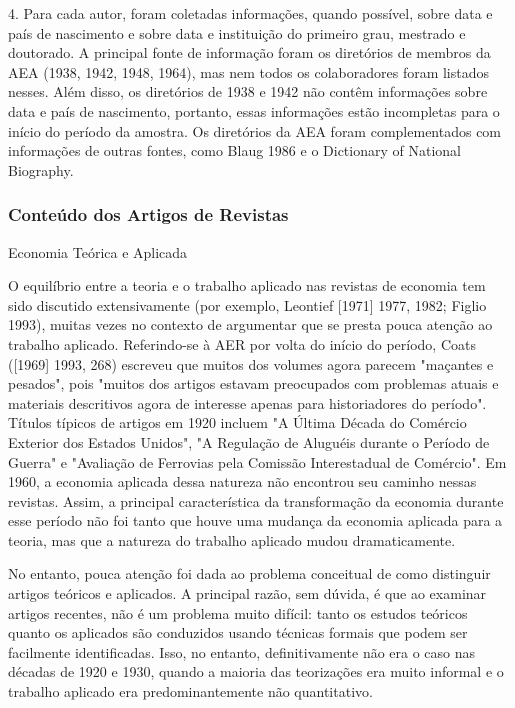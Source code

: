 \documentclass[12pt]{article}
\begin{document}
4. Para cada autor, foram coletadas informações, quando possível, sobre data e país de nascimento e sobre data e instituição do primeiro grau, mestrado e doutorado. A principal fonte de informação foram os diretórios de membros da AEA (1938, 1942, 1948, 1964), mas nem todos os colaboradores foram listados nesses. Além disso, os diretórios de 1938 e 1942 não contêm informações sobre data e país de nascimento, portanto, essas informações estão incompletas para o início do período da amostra. Os diretórios da AEA foram complementados com informações de outras fontes, como Blaug 1986 e o Dictionary of National Biography.

\subsubsection{\textbf{Conteúdo dos Artigos de Revistas}}
Economia Teórica e Aplicada

O equilíbrio entre a teoria e o trabalho aplicado nas revistas de economia tem sido discutido extensivamente (por exemplo, Leontief [1971] 1977, 1982; Figlio 1993), muitas vezes no contexto de argumentar que se presta pouca atenção ao trabalho aplicado. Referindo-se à AER por volta do início do período, Coats ([1969] 1993, 268) escreveu que muitos dos volumes agora parecem "maçantes e pesados", pois "muitos dos artigos estavam preocupados com problemas atuais e materiais descritivos agora de interesse apenas para historiadores do período". Títulos típicos de artigos em 1920 incluem "A Última Década do Comércio Exterior dos Estados Unidos", "A Regulação de Aluguéis durante o Período de Guerra" e "Avaliação de Ferrovias pela Comissão Interestadual de Comércio". Em 1960, a economia aplicada dessa natureza não encontrou seu caminho nessas revistas. Assim, a principal característica da transformação da economia durante esse período não foi tanto que houve uma mudança da economia aplicada para a teoria, mas que a natureza do trabalho aplicado mudou dramaticamente.

No entanto, pouca atenção foi dada ao problema conceitual de como distinguir artigos teóricos e aplicados. A principal razão, sem dúvida, é que ao examinar artigos recentes, não é um problema muito difícil: tanto os estudos teóricos quanto os aplicados são conduzidos usando técnicas formais que podem ser facilmente identificadas. Isso, no entanto, definitivamente não era o caso nas décadas de 1920 e 1930, quando a maioria das teorizações era muito informal e o trabalho aplicado era predominantemente não quantitativo.
\end{document}
